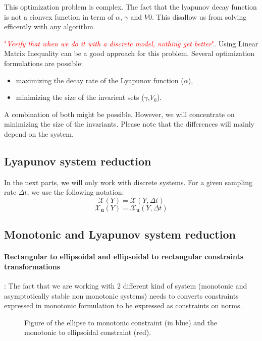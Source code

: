 \documentclass{article}
\theoremstyle{named}
\newcommand{\vect}[1]{\ensuremath{ \mathbf{#1}}}
\newcommand\comment[1]{\textcolor{red}{"\textit{#1}"}}
\begin{document}
This optimization problem is complex.
The fact that the lyapunov decay function is not a cionvex function in term of $\alpha$, $\gamma$ and $V0$. This disallow us from solving efficently with any algorithm.


\comment{Verify that when we do it with a discrete model, nothing get better}.
Using Linear Matrix Inequality can be a good approach for this problem.
Several optimization formulations are possible:
\begin{itemize}
\item maximizing the decay rate of the Lyapunov function ($\alpha$),
\item minimizing the size of the invarient sets ($\gamma$,$V_0$).
\end{itemize}
A combination of both might be possible.
However, we will concentrate on minimizing the size of the invariants.
Please note that the differences will mainly depend on the system.

\cite{Polyak200815349}
\cite{LMI_book}


\subsection{Lyapunov system reduction}
In the next parts, we will only work with discrete systems. For a given sampling rate $\Delta t$, we use the following notation:
$$\mathcal{X}(Y) = \mathcal{X}(Y,\Delta t)$$
$$\mathcal{X}_{\vect{u}}(Y) = \mathcal{X}_{\vect{u}}(Y,\Delta t)$$


\subsection{Monotonic and Lyapunov system reduction}
\paragraph{Rectangular to ellipsoidal and ellipsoidal to rectangular constraints transformations}:
The fact that we are working with 2 different kind of system (monotonic and asymptotically stable non monotonic systems) needs to converts constraints expressed in monotonic formulation to be expressed as constraints on norms.


\begin{figure}
	\center
	
	\caption{Figure of the ellipse to monotonic constraint (in blue) and the monotonic to ellipsoidal constraint (red).}
\end{figure}
\end{document}
